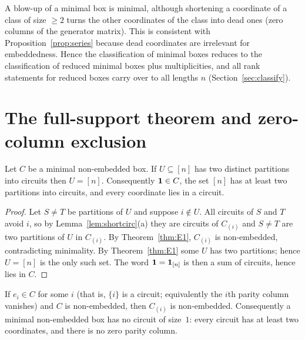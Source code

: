 
\begin{remark}
A blow-up of a minimal box is minimal, although shortening a coordinate of a class of size $\ge2$ turns the other coordinates of the class into dead ones (zero columns of the generator matrix). This is consistent with Proposition~\ref{prop:series} because dead coordinates are irrelevant for embeddedness. Hence the classification of minimal boxes reduces to the classification of reduced minimal boxes plus multiplicities, and all rank statements for reduced boxes carry over to all lengths $n$ (Section~\ref{sec:classify}).
\end{remark}

\section{The full-support theorem and zero-column exclusion}\label{sec:fullsupport}

\begin{theorem}\label{thm:F1}
Let $C$ be a minimal non-embedded box. If $U\subseteq[n]$ has two distinct partitions into circuits then $U=[n]$. Consequently $\mathbf 1\in C$, the set $[n]$ has at least two partitions into circuits, and every coordinate lies in a circuit.
\end{theorem}

\begin{proof}
Let $S\ne T$ be partitions of $U$ and suppose $i\notin U$. All circuits of $S$ and $T$ avoid $i$, so by Lemma~\ref{lem:shortcirc}(a) they are circuits of $C_{(i)}$ and $S\ne T$ are two partitions of $U$ in $C_{(i)}$. By Theorem~\ref{thm:E1}, $C_{(i)}$ is non-embedded, contradicting minimality. By Theorem~\ref{thm:E1} some $U$ has two partitions; hence $U=[n]$ is the only such set. The word $\mathbf 1=\mathbf 1_{[n]}$ is then a sum of circuits, hence lies in $C$.
\end{proof}


\begin{proposition}\label{prop:nosingleton}
If $e_i\in C$ for some $i$ (that is, $\{i\}$ is a circuit; equivalently the $i$th parity column vanishes) and $C$ is non-embedded, then $C_{(i)}$ is non-embedded. Consequently a minimal non-embedded box has no circuit of size~$1$: every circuit has at least two coordinates, and there is no zero parity column.
\end{proposition}

